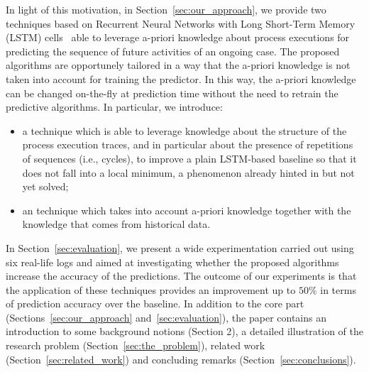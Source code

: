 In light of this motivation, in Section~\ref{sec:our_approach}, we provide two techniques based on Recurrent Neural Networks with Long Short-Term Memory (LSTM) cells~\cite{hochreiter1997long} able to leverage a-priori knowledge about process executions for predicting the sequence of future activities of an ongoing case. The proposed algorithms are opportunely tailored in a way that the a-priori knowledge is not taken into account for training the predictor. In this way, the a-priori knowledge can be changed on-the-fly at prediction time without the need to retrain the predictive algorithms.
In particular, we introduce:
\begin{itemize}
	\item a \nocycle technique which is able to leverage knowledge about the structure of the process execution traces, and in particular about the presence of repetitions of sequences (i.e., cycles), to improve a plain LSTM-based baseline so that it does not fall into a local minimum, a phenomenon already hinted in \cite{niek96732} but not yet solved;
	\item an \protrack technique which takes into account a-priori knowledge together with the knowledge that comes from historical data.
\end{itemize}
In Section~\ref{sec:evaluation}, we present a wide experimentation carried out using six real-life logs and aimed at investigating whether the proposed algorithms increase the accuracy of the predictions. The outcome of our experiments is that the application of these techniques provides an improvement up to $50\%$ in terms of prediction accuracy over the baseline.
In addition to the core part (Sections~\ref{sec:our_approach} and~\ref{sec:evaluation}), the paper contains an introduction to some background notions (Section 2), a detailed illustration of the research problem (Section~\ref{sec:the_problem}), related work (Section~\ref{sec:related_work}) and concluding remarks (Section~\ref{sec:conclusions}).


